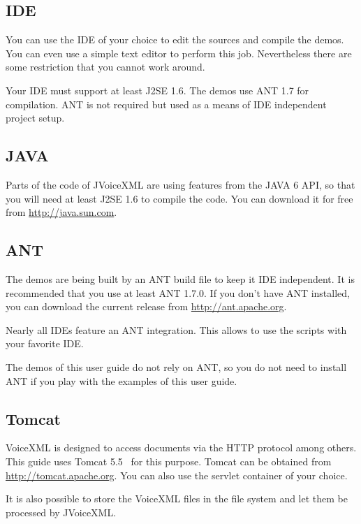 \documentclass[11pt,a4paper]{article}
\begin{document}
\subsection{IDE}
\label{sec:ide}

You can use the IDE of your choice to edit the sources and compile the 
demos. You can even use a simple text editor to perform this job.
Nevertheless there are some restriction that you cannot work around.

Your IDE must support at least J2SE 1.6. The demos use ANT 1.7 for compilation. 
ANT is not required but used as a means of IDE independent project setup.

\subsection{JAVA}
\label{sec:java}

Parts of the code of JVoiceXML are using features from the JAVA 6 API, so that
you will need at least J2SE 1.6 to compile the code. You can download it
for free from \url{http://java.sun.com}.

\subsection{ANT}
\label{sec:ant}

The demos are being built by an ANT build file to keep it IDE independent. It is
recommended that you use at least ANT 1.7.0. 
If you don't have ANT installed, you can download the current release
from \url{http://ant.apache.org}.

Nearly all IDEs feature an ANT integration. This allows to use the scripts with
your favorite IDE.

The demos of this user guide do not rely on ANT, so you do not need to install
ANT if you play with the examples of this user guide.

\subsection{Tomcat}
\label{sec:tomcat}

VoiceXML is designed to access documents via the HTTP protocol among others. This
guide uses Tomcat 5.5~\cite{apache:tomcat} for this purpose.
Tomcat can be obtained
from \url{http://tomcat.apache.org}. You can also use the servlet container of
your choice.

It is also possible to store the VoiceXML files in the file system and let
them be processed by JVoiceXML.
\end{document}
